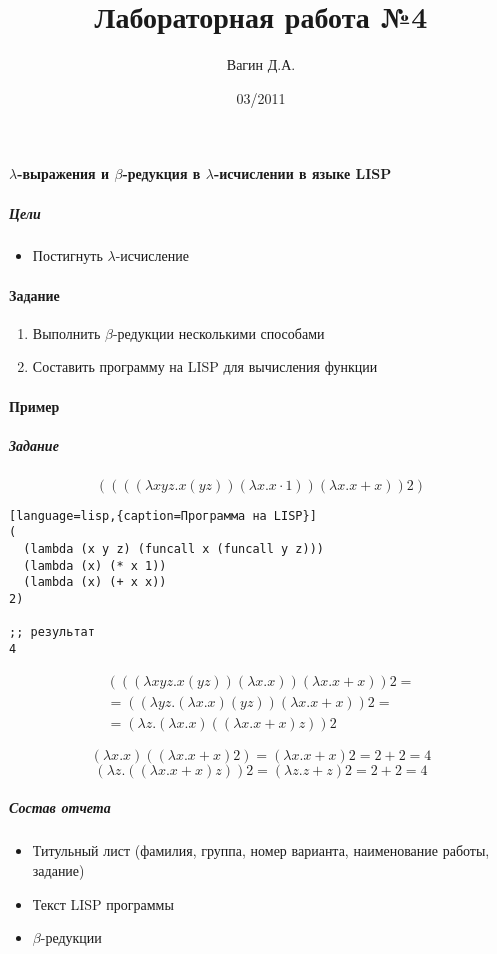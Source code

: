 \documentclass[a4paper,12pt]{article}
\title{Лабораторная работа №4}
\author{Вагин Д.А.}
\date{03/2011}
\begin{document}

\paragraph{$\lambda$-выражения и $\beta$-редукция в $\lambda$-исчислении в языке LISP}
\subparagraph{Цели}
\begin{itemize}
	\item Постигнуть $\lambda$-исчисление
\end{itemize}

\paragraph{Задание}
\begin{enumerate}
	\item Выполнить $\beta$-редукции несколькими способами
	\item Составить программу на LISP для вычисления функции
\end{enumerate}

\paragraph{Пример}
\subparagraph{Задание}
\[((((\lambda xyz.x(yz))(\lambda x.x\cdot 1))(\lambda x.x+x))2)\]

\begin{lstlisting}[language=lisp,{caption=Программа на LISP}]
( 
  (lambda (x y z) (funcall x (funcall y z))) 
  (lambda (x) (* x 1)) 
  (lambda (x) (+ x x)) 
2)

;; результат
4
\end{lstlisting}

\begin{align*}
(((\lambda xyz.x(yz))(\lambda x.x))(\lambda x.x+x))2=\\
=((\lambda yz.(\lambda x.x)(yz))(\lambda x.x+x))2 =\\
=(\lambda z.(\lambda x.x)((\lambda x.x+x)z))2
\end{align*}

\[(\lambda x.x)((\lambda x.x+x)2)=(\lambda x.x+x)2=2+2=4\]
\[(\lambda z.((\lambda x.x+x)z))2=(\lambda z.z+z)2=2+2=4\]


\subparagraph{Состав отчета}
\begin{itemize}
	\item Титульный лист (фамилия, группа, номер варианта, наименование работы, задание)
	\item Текст LISP программы
	\item $\beta$-редукции
\end{itemize}
\end{document}

